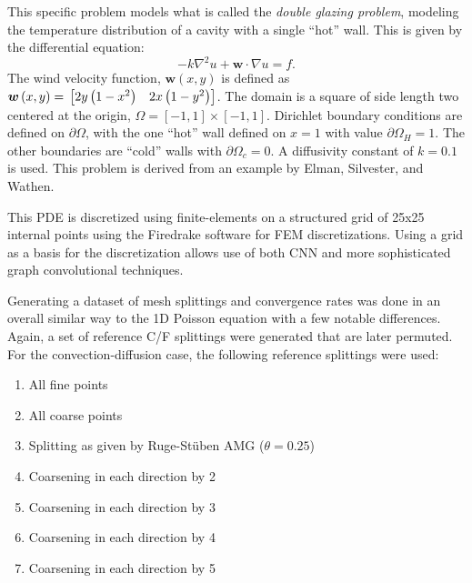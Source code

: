 \documentclass[review]{siamart190516}
\renewcommand{\vec}[1]{\bm{{#1}}}
\newcommand{\grad}{\nabla}
\begin{document}
This specific problem models what is called the \textit{double glazing problem}, modeling the temperature distribution of a cavity with a single ``hot'' wall.  This is given by the differential equation:
%
\begin{equation}\label{eqn:conv}
  -k\grad^2u + \vec{w}\cdot\grad u = f.
\end{equation}
%
The wind velocity function, $\vec{w}\left(x,y\right)$ is defined as $\vec{w}\left(x,y\right)=\\ \begin{bmatrix} 2y\left(1-x^2\right) & 2x\left(1-y^2\right) \end{bmatrix}$.  The domain is a square of side length two centered at the origin, $\Omega = \left[-1,1\right] \times \left[-1,1\right]$.  Dirichlet boundary conditions are defined on $\partial \Omega$, with the one ``hot'' wall defined on $x=1$ with value $\partial \Omega_H=1$.  The other boundaries are ``cold'' walls with $\partial \Omega_c=0$.  A diffusivity constant of $k=0.1$ is used.  This problem is derived from an example by Elman, Silvester, and Wathen\cite{silvester}.

This PDE is discretized using finite-elements on a structured grid of 25x25 internal points using the Firedrake software for FEM discretizations\cite{Dalcin2011, Rathgeber2016,Homolya2016,McRae2016,MUMPS01,MUMPS02}.  Using a grid as a basis for the discretization allows use of both CNN and more sophisticated graph convolutional techniques.

Generating a dataset of mesh splittings and convergence rates was done in an overall similar way to the 1D Poisson equation with a few notable differences.  Again, a set of reference C/F splittings were generated that are later permuted.  For the convection-diffusion case, the following reference splittings were used:

\begin{enumerate}
\item All fine points
\item All coarse points
\item Splitting as given by Ruge-St\"{u}ben AMG ($\theta=0.25$) \cite{rs, pyamg}
\item Coarsening in each direction by 2
\item Coarsening in each direction by 3
\item Coarsening in each direction by 4
\item Coarsening in each direction by 5
\end{enumerate}
\end{document}
